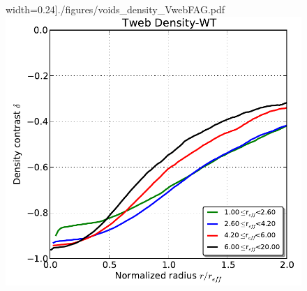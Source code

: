 \documentclass[a4,useAMS,usenatbib,usegraphicx]{latex/mn2e}
\begin{document}
\begin{flushleft}
\begin{figure}
  width=0.24\textheight]{./figures/voids_density_VwebFAG.pdf}
  \includegraphics[trim = 1mm 2mm 4mm 0mm, clip, keepaspectratio=true,
  width=0.24\textheight]{./figures/voids_density_TwebDLG.pdf}
  
  \
  

\end{figure}
\end{flushleft}
\end{document}
